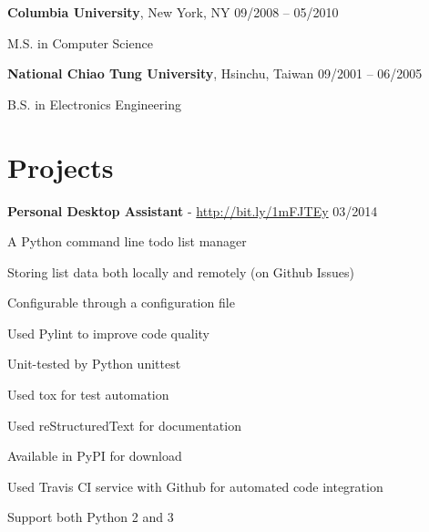 \documentclass[margin,line]{resume}
\begin{document}
\begin{resume}
    \textbf{Columbia University}, New York, NY \hfill 09/2008 -- 05/2010 \vspace{-3mm}\\\vspace{-1mm}%
      \begin{list2}
       \item M.S. in Computer Science
      \end{list2}
 
    \textbf{National Chiao Tung University}, Hsinchu, Taiwan \hfill 09/2001 -- 06/2005 \vspace{-3mm}\\\vspace{-1mm}%
      \begin{list2}
       \item B.S. in Electronics Engineering
      \end{list2}

    \section{\mysidestyle Projects}

    \textbf{Personal Desktop Assistant} - \url{http://bit.ly/1mFJTEy} \hfill 03/2014 \vspace{-3mm}\\\vspace{-1mm}%
      \begin{list2}
       \item A Python command line todo list manager
       \item Storing list data both locally and remotely (on Github Issues)
       \item Configurable through a configuration file
       \item Used Pylint to improve code quality
       \item Unit-tested by Python unittest
       \item Used tox for test automation
       \item Used reStructuredText for documentation
       \item Available in PyPI for download
       \item Used Travis CI service with Github for automated code integration
       \item Support both Python 2 and 3
      \end{list2}


\end{resume}
\end{document}
